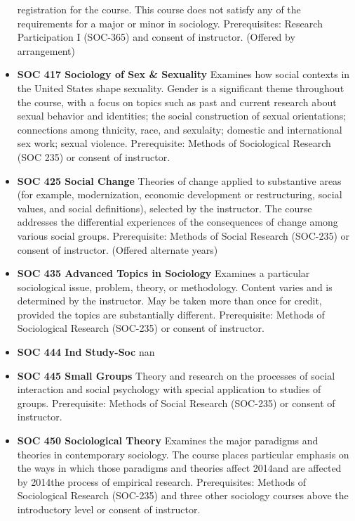 \documentclass[
  letterpaper,
]{scrbook}
\begin{document}
\begin{itemize}
  registration for the course. This course does not satisfy any of the
  requirements for a major or minor in sociology. Prerequisites:
  Research Participation I (SOC-365) and consent of instructor. (Offered
  by arrangement)
\item
  \textbf{SOC 417 Sociology of Sex \& Sexuality} Examines how social
  contexts in the United States shape sexuality. Gender is a significant
  theme throughout the course, with a focus on topics such as past and
  current research about sexual behavior and identities; the social
  construction of sexual orientations; connections among thnicity, race,
  and sexulaity; domestic and international sex work; sexual violence.
  Prerequisite: Methods of Sociological Research (SOC 235) or consent of
  instructor.\\
\item
  \textbf{SOC 425 Social Change} Theories of change applied to
  substantive areas (for example, modernization, economic development or
  restructuring, social values, and social definitions), selected by the
  instructor. The course addresses the differential experiences of the
  consequences of change among various social groups. Prerequisite:
  Methods of Social Research (SOC-235) or consent of instructor.
  (Offered alternate years)
\item
  \textbf{SOC 435 Advanced Topics in Sociology} Examines a particular
  sociological issue, problem, theory, or methodology. Content varies
  and is determined by the instructor. May be taken more than once for
  credit, provided the topics are substantially different. Prerequisite:
  Methods of Sociological Research (SOC-235) or consent of instructor.
\item
  \textbf{SOC 444 Ind Study-Soc} nan\\
\item
  \textbf{SOC 445 Small Groups} Theory and research on the processes of
  social interaction and social psychology with special application to
  studies of groups. Prerequisite: Methods of Social Research (SOC-235)
  or consent of instructor.
\item
  \textbf{SOC 450 Sociological Theory} Examines the major paradigms and
  theories in contemporary sociology. The course places particular
  emphasis on the ways in which those paradigms and theories affect
  2014and are affected by 2014the process of empirical research.
  Prerequisites: Methods of Sociological Research (SOC-235) and three
  other sociology courses above the introductory level or consent of
  instructor.\\

\end{itemize}
\end{document}
